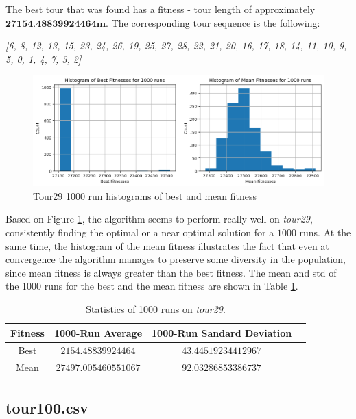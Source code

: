 \documentclass[a4paper,10pt]{article}
\begin{document}
The best tour that was found has a fitness - tour length of approximately $\textbf{27154.48839924464m}$. The corresponding tour sequence is the following:
\begin{center}
\textit{[6, 8, 12, 13, 15, 23, 24, 26, 19, 25, 27, 28, 22, 21, 20, 16, 17, 18, 14, 11, 10, 9, 5, 0, 1, 4, 7, 3, 2]}
\end{center}

\begin{figure}[H]
     \centering
     \includegraphics[width=\textwidth]{results/4.2/tour29_histogram.png}
     \caption{Tour29 1000 run histograms of best and mean fitness}
     \label{fig:tour29histogram}
\end{figure}

Based on Figure \ref{fig:tour29histogram}, the algorithm seems to perform really well on \textit{tour29}, consistently finding the optimal or a near optimal solution for a $1000$ runs. At the same time, the histogram of the mean fitness illustrates the fact that even at convergence the algorithm manages to preserve some diversity in the population, since mean fitness is always greater than the best fitness. The mean and std of the 1000 runs for the best and the mean fitness are shown in Table \ref{table:1000run_statistics}.

\begin{table}[H]
\centering
\begin{tabular}{ |c|c|c|c| } 
\hline
Fitness & 1000-Run Average & 1000-Run Sandard Deviation\\
\hline
Best & $2154.48839924464$ & $43.44519234412967$ \\ 
Mean & $27497.005460551067$ & $92.03286853386737$ \\ 
\hline
\end{tabular}
\caption{Statistics of 1000 runs on \textit{tour29}.}
\label{table:1000run_statistics}
\end{table}


\subsection{tour100.csv} \label{ss:tour100}
\end{document}
